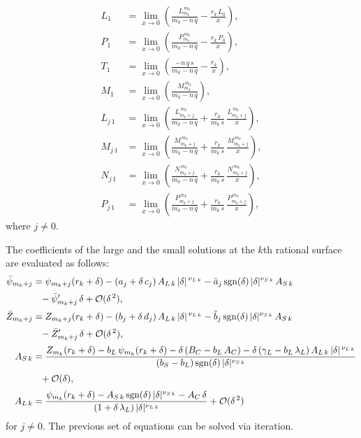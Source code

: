 \documentclass[12pt,prb,aps]{revtex4-1}
\begin{document}
\begin{align}
L_1&= \lim_{x\rightarrow 0}\left(\frac{L_{m_k}^{\,m_k}}{m_k-n\,q}-\frac{r_k\,L_0}{x}\right),\\[0.5ex]
P_1&=  \lim_{x\rightarrow 0}\left(\frac{P_{m_k}^{\,m_k}}{m_k-n\,q}-\frac{r_k\,P_0}{x}\right),\\[0.5ex]
T_1 &= \lim_{x\rightarrow 0}\left(\frac{-n\,q\,s}{m_k-n\,q}-\frac{r_k}{x}\right),\\[0.5ex]
M_1 &= \lim_{x\rightarrow 0}\left(\frac{M_{m_k}^{\,m_k}}{m_k-n\,q}\right),\\[0.5ex]
L_{j\,1}&=\lim_{x\rightarrow 0}\left(\frac{L_{m_k+j}^{\,m_k}}{m_k-n\,q}+\frac{r_k}{m_k\,s}\,\frac{L_{m_k+j}^{\,m_k}}{x}\right),\\[0.5ex]
M_{j\,1}&=\lim_{x\rightarrow 0}\left(\frac{M_{m_k+j}^{\,m_k}}{m_k-n\,q}+\frac{r_k}{m_k\,s}\,\frac{M_{m_k+j}^{\,m_k}}{x}\right),\\[0.5ex]
N_{j\,1}&=\lim_{x\rightarrow 0}\left(\frac{N_{m_k+j}^{\,m_k}}{m_k-n\,q}+\frac{r_k}{m_k\,s}\,\frac{N_{m_k+j}^{\,m_k}}{x}\right),\\[0.5ex]
P_{j\,1}&=\lim_{x\rightarrow 0}\left(\frac{P_{m_k+j}^{\,m_k}}{m_k-n\,q}+\frac{r_k}{m_k\,s}\,\frac{P_{m_k+j}^{\,m_k}}{x}\right),
\end{align}
where $j\neq 0$. 

The coefficients of the large and the small solutions at the $k$th rational surface are evaluated as follows:
\begin{align}
\bar{\psi}_{m_k+j} &= \psi_{m_k+j}(r_k+\delta)- (a_j+\delta\,c_j)\,A_{L\,k}\,|\delta|^{\,\nu_{L\,k}}-\tilde{a}_j\,{\rm sgn}(\delta)\,|\delta|^{\nu_{S\,k}}\,A_{S\,k}\nonumber\\[0.5ex]
&\phantom{=}-\bar{\psi}'_{m_k+j}\,\delta+{\cal O}(\delta^{\,2}),\\[0.5ex]
\bar{Z}_{m_k+j}&= Z_{m_k+j}(r_k+\delta)- (b_j+\delta\,d_j)\,A_{L\,k}\,|\delta|^{\,\nu_{L\,k}}-\tilde{b}_j\,{\rm sgn}(\delta)\,|\delta|^{\nu_{S\,k}}\,A_{S\,k}\nonumber\\[0.5ex]
&\phantom{=}-\bar{Z}'_{m_k+j}\,\delta+{\cal O}(\delta^{\,2}),\\[0.5ex]
A_{S\,k} &= \frac{Z_{m_k}(r_k+\delta)-b_L\,\psi_{m_k}(r_k+\delta)-\delta\,(B_C-b_L\,A_C)-\delta\,(\gamma_L-b_L\,\lambda_L)\,A_{L\,k}\,|\delta|^{\,\nu_{L\,k}}}{
(b_S-b_L)\,{\rm sgn}(\delta)\,|\delta|^{\nu_{S\,k}}}\nonumber\\[0.5ex]
&\phantom{=}+{\cal O}(\delta),\\[0.5ex]
A_{L\,k} &= \frac{\psi_{m_k}(r_k+\delta)-A_{S\,k}\,{\rm sgn}(\delta)\,|\delta|^{\nu_{S\,k}}-A_C\,\delta}{(1+\delta\,\lambda_L)\,|\delta|^{\nu_{L\,k}}}+{\cal O}(\delta^{\,2})
\end{align}
for $j\neq 0$. The previous set of equations can be solved via iteration.
\end{document}
